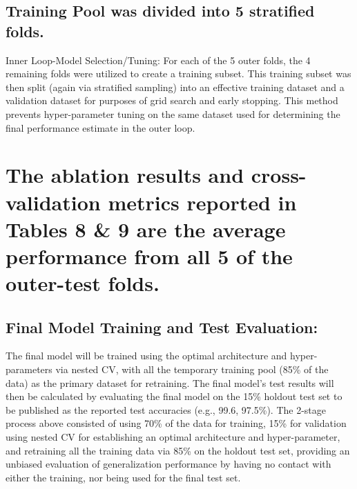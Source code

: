 \documentclass[twocolumn]{svjour3}
\begin{document}
\subsection{Training Pool was divided into 5 stratified folds.}
Inner Loop-Model Selection/Tuning: For each of the 5 outer folds, the 4 remaining folds were utilized to create a training subset. This training subset was then split (again via stratified sampling) into an effective training dataset and a validation dataset for purposes of grid search and early stopping. This method prevents hyper-parameter tuning on the same dataset used for determining the final performance estimate in the outer loop.
\section{The ablation results and cross-validation metrics reported in Tables 8 \& 9 are the average performance from all 5 of the outer-test folds.}
\subsection{Final Model Training and Test Evaluation:}
The final model will be trained using the optimal architecture and hyper-parameters via nested CV, with all the temporary training pool (85\% of the data) as the primary dataset for retraining.
The final model's test results will then be calculated by evaluating the final model on the 15\% holdout test set to be published as the reported test accuracies (e.g., 99.6, 97.5\%).
The 2-stage process above consisted of using 70\% of the data for training, 15\% for validation using nested CV for establishing an optimal architecture and hyper-parameter, and retraining all the training data via 85\% on the holdout test set, providing an unbiased evaluation of generalization performance by having no contact with either the training, nor being used for the final test set.
\end{document}
